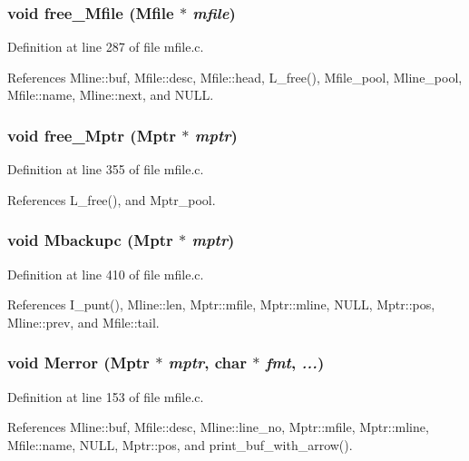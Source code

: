 \subsubsection{\setlength{\rightskip}{0pt plus 5cm}void free\_\-Mfile (\bf{Mfile} $\ast$ {\em mfile})}\label{mfile_8c_7da12f4f5725e6715e26a4d50211d759}




Definition at line 287 of file mfile.c.

References Mline::buf, Mfile::desc, Mfile::head, L\_\-free(), Mfile\_\-pool, Mline\_\-pool, Mfile::name, Mline::next, and NULL.
\subsubsection{\setlength{\rightskip}{0pt plus 5cm}void free\_\-Mptr (\bf{Mptr} $\ast$ {\em mptr})}\label{mfile_8c_68642c4e139f1f85fc082dea0fb57369}




Definition at line 355 of file mfile.c.

References L\_\-free(), and Mptr\_\-pool.
\subsubsection{\setlength{\rightskip}{0pt plus 5cm}void Mbackupc (\bf{Mptr} $\ast$ {\em mptr})}\label{mfile_8c_464243e3327e775445c8c26552489906}




Definition at line 410 of file mfile.c.

References I\_\-punt(), Mline::len, Mptr::mfile, Mptr::mline, NULL, Mptr::pos, Mline::prev, and Mfile::tail.
\subsubsection{\setlength{\rightskip}{0pt plus 5cm}void Merror (\bf{Mptr} $\ast$ {\em mptr}, char $\ast$ {\em fmt},  {\em ...})}\label{mfile_8c_a088b3c38141dc63cd443ac3a5ffc324}




Definition at line 153 of file mfile.c.

References Mline::buf, Mfile::desc, Mline::line\_\-no, Mptr::mfile, Mptr::mline, Mfile::name, NULL, Mptr::pos, and print\_\-buf\_\-with\_\-arrow().
